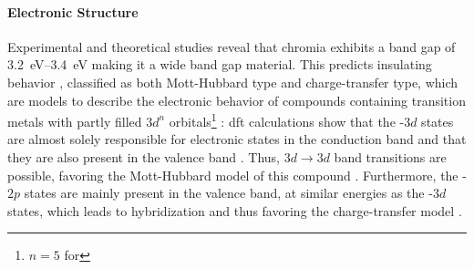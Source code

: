 \paragraph{Electronic Structure}
Experimental and theoretical studies reveal that chromia exhibits a band gap of \qtyrange{3.2}{3.4}{\eV}
    \cite{mi2018,robbert1998,lebreau2014,arca2013}
making it a wide band gap material.
This predicts insulating behavior \cite{arca2013}, classified as both Mott-Hubbard type and charge-transfer type, which are models to describe the electronic behavior of compounds containing transition metals with partly filled $3d^n$ orbitals\footnote{$n=5$ for }
    \cite{catti1996,mi2018,lebreau2014}:
\gls{dft} calculations show that the -$3d$ states are almost solely responsible for electronic states in the conduction band and that they are also present in the valence band
    \cite{mi2018,lebreau2014}.
Thus, $3d\longrightarrow 3d$ band transitions are possible, favoring the Mott-Hubbard model of this compound
    \cite{lebreau2014}.
Furthermore, the -$2p$ states are mainly present in the valence band, at similar energies as the -$3d$ states, which leads to hybridization and thus favoring the charge-transfer model
    \cite{lebreau2014}.

